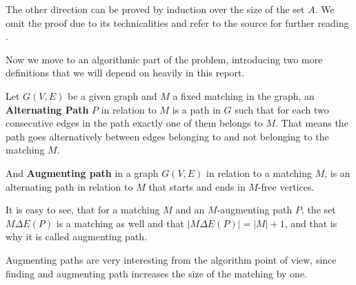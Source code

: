 The other direction can be proved by induction over the size of the set $A$. We omit the proof due to its technicalities and refer to the source for further reading \cite{hall2009representatives}.

Now we move to an algorithmic part of the problem, introducing two more definitions that we will depend on heavily in this report.

\begin{definition}
	Let $G(V, E)$ be a given graph and $M$ a fixed matching in the graph, an \textbf{Alternating Path} $P$ in relation to $M$ is a path in $G$ such that for each two consecutive edges in the path exactly one of them belongs to $M$. That means  the path goes alternatively between edges belonging to and not belonging to the matching $M$.
\end{definition}

\begin{definition}
	And \textbf{Augmenting path} in a graph $G(V, E)$ in relation to a matching $M$, is an alternating path in relation to $M$ that starts and ends in $M$-free vertices.
\end{definition}
It is easy to see, that for a matching $M$ and an $M$-augmenting path $P$, the set $M \Delta E(P)$ is a matching as well and that $|M \Delta E(P)| = |M| + 1$, and that is why it is called augmenting path.

Augmenting paths are very interesting from the algorithm point of view, since finding and augmenting path increases the size of the matching by one.

